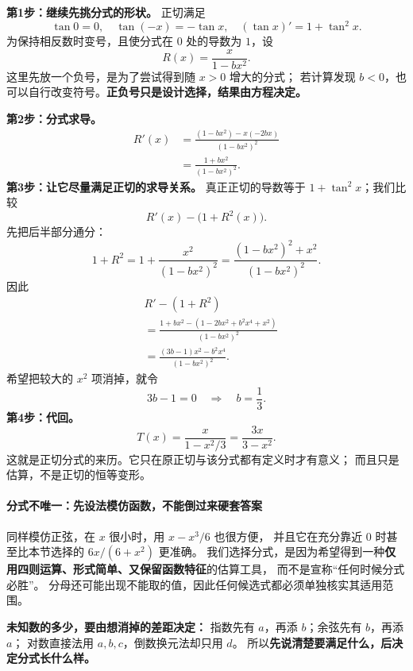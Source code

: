 \begin{proofbox}
\textbf{第1步：继续先挑分式的形状。}
正切满足
\[
 \tan0=0,\quad \tan(-x)=-\tan x,
 \quad (\tan x)'=1+\tan^2x.
\]
为保持相反数时变号，且使分式在 $0$ 处的导数为 $1$，设
\[
 R(x)=\frac{x}{1-bx^2}.
\]
这里先放一个负号，是为了尝试得到随 $x>0$ 增大的分式；
若计算发现 $b<0$，也可以自行改变符号。\textbf{正负号只是设计选择，结果由方程决定。}

\textbf{第2步：分式求导。}
\[
 \begin{aligned}
 R'(x)&=\frac{(1-bx^2)-x(-2bx)}{(1-bx^2)^2}\\
 &=\frac{1+bx^2}{(1-bx^2)^2}.
 \end{aligned}
\]
\textbf{第3步：让它尽量满足正切的求导关系。}
真正正切的导数等于 $1+\tan^2x$；我们比较
\[
 R'(x)-\bigl(1+R^2(x)\bigr).
\]
先把后半部分通分：
\[
 1+R^2=1+\frac{x^2}{(1-bx^2)^2}
 =\frac{(1-bx^2)^2+x^2}{(1-bx^2)^2}.
\]
因此
\[
 \begin{aligned}
 &R'-(1+R^2)\\
 &=\frac{1+bx^2-(1-2bx^2+b^2x^4+x^2)}{(1-bx^2)^2}\\
 &=\boxed{\frac{(3b-1)x^2-b^2x^4}{(1-bx^2)^2}}.
 \end{aligned}
\]
希望把较大的 $x^2$ 项消掉，就令
\[
 3b-1=0\quad\Longrightarrow\quad\boxed{b=\frac13}.
\]
\textbf{第4步：代回。}
\[
 \boxed{T(x)=\frac{x}{1-x^2/3}=\frac{3x}{3-x^2}}.
\]
这就是正切分式的来历。它只在原正切与该分式都有定义时才有意义；
而且只是估算，不是正切的恒等变形。

\medskip

\paragraph{分式不唯一：先设法模仿函数，不能倒过来硬套答案}
同样模仿正弦，在 $x$ 很小时，用 $x-x^3/6$ 也很方便，
并且它在充分靠近 $0$ 时甚至比本节选择的 $6x/(6+x^2)$ 更准确。
我们选择分式，是因为希望得到一种\textbf{仅用四则运算、形式简单、又保留函数特征}的估算工具，
而不是宣称“任何时候分式必胜”。
分母还可能出现不能取的值，因此任何候选式都必须单独核实其适用范围。

\textbf{未知数的多少，要由想消掉的差距决定：}
指数先有 $a$，再添 $b$；余弦先有 $b$，再添 $a$；
对数直接法用 $a,b,c$，倒数换元法却只用 $d$。
所以\textbf{先说清楚要满足什么，后决定分式长什么样。}


\end{proofbox}
